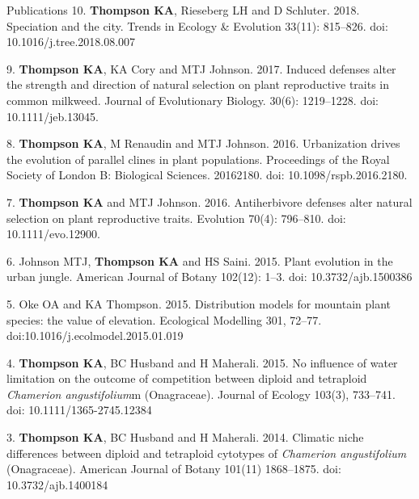 \documentclass[12pt]{article}
\begin{document}
\begin{rSection}{Publications}
\noindent\hspace{.1cm}10. \textbf{Thompson KA}, Rieseberg LH and D Schluter. 2018. Speciation and the city. Trends in Ecology & Evolution 33(11): 815–826. doi: 10.1016/j.tree.2018.08.007

\noindent\hspace{.1cm}9. \textbf{Thompson KA}, KA Cory and MTJ Johnson. 2017. Induced defenses alter the strength and direction of natural selection on plant reproductive traits in common milkweed. Journal of Evolutionary Biology. 30(6): 1219–1228. doi: 10.1111/jeb.13045.

\noindent\hspace{.1cm}8. \textbf{Thompson KA}, M Renaudin and MTJ Johnson. 2016. Urbanization drives the evolution of parallel clines in plant populations. Proceedings of the Royal Society of London B: Biological Sciences. 20162180. doi: 10.1098/rspb.2016.2180.

\noindent\hspace{.1cm}7. \textbf{Thompson KA} and MTJ Johnson. 2016. Antiherbivore defenses alter natural selection on plant reproductive traits. Evolution 70(4): 796–810. doi: 10.1111/evo.12900.

\noindent\hspace{.1cm}6. Johnson MTJ, \textbf{Thompson KA} and HS Saini. 2015. Plant evolution in the urban jungle. American Journal of Botany 102(12): 1–3. doi: 10.3732/ajb.1500386

\noindent\hspace{.1cm}5. Oke OA and KA Thompson. 2015. Distribution models for mountain plant species: the value of elevation. Ecological Modelling 301, 72–77. doi:10.1016/j.ecolmodel.2015.01.019

\noindent\hspace{.1cm}4. \textbf{Thompson KA}, BC Husband and H Maherali. 2015. No influence of water limitation on the outcome of competition between diploid and tetraploid \textit{Chamerion angustifolium}m (Onagraceae). Journal of Ecology 103(3), 733–741. doi: 10.1111/1365-2745.12384

\noindent\hspace{.1cm}3. \textbf{Thompson KA}, BC Husband and H Maherali. 2014. Climatic niche differences between diploid and tetraploid cytotypes of \textit{Chamerion angustifolium} (Onagraceae). American Journal of Botany 101(11) 1868–1875. doi: 10.3732/ajb.1400184 


\end{rSection}
\end{document}
